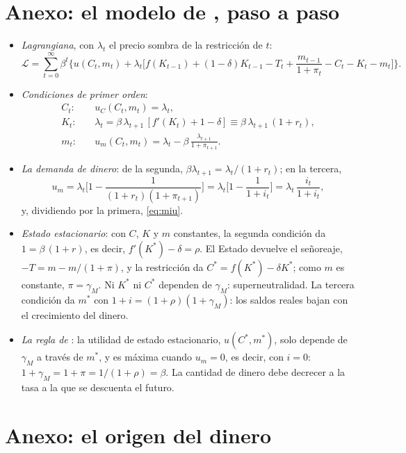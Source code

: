 \documentclass[11pt]{article}
\begin{document}
\clearpage
\appendix

\section{Anexo: el modelo de , paso a paso}\label{anexo:miu}

\begin{itemize}
\item \emph{Lagrangiana}, con $\lambda_t$ el precio sombra de la restricción de $t$:
  $$\mathcal{L}=\sum_{t=0}^{\infty}\beta^t\Big\{u(C_t,m_t)+\lambda_t\Big[f(K_{t-1})+(1-\delta)K_{t-1}-T_t+\frac{m_{t-1}}{1+\pi_t}-C_t-K_t-m_t\Big]\Big\}.$$
\item \emph{Condiciones de primer orden}:
  \begin{align*}
  C_t:&\quad u_C(C_t,m_t)=\lambda_t,\\
  K_t:&\quad \lambda_t=\beta\,\lambda_{t+1}\,[f'(K_t)+1-\delta]\equiv\beta\,\lambda_{t+1}\,(1+r_t),\\
  m_t:&\quad u_m(C_t,m_t)=\lambda_t-\beta\,\frac{\lambda_{t+1}}{1+\pi_{t+1}}.
  \end{align*}
\item \emph{La demanda de dinero}: de la segunda, $\beta\lambda_{t+1}=\lambda_t/(1+r_t)$; en la tercera,
  $$u_m=\lambda_t\Big[1-\frac{1}{(1+r_t)(1+\pi_{t+1})}\Big]=\lambda_t\Big[1-\frac{1}{1+i_t}\Big]=\lambda_t\,\frac{i_t}{1+i_t},$$
  y, dividiendo por la primera, \eqref{eq:miu}.\findemo
\item \emph{Estado estacionario}: con $C$, $K$ y $m$ constantes, la segunda condición da $1=\beta\,(1+r)$, es decir, $f'(K^*)-\delta=\rho$. El Estado devuelve el señoreaje, $-T=m-m/(1+\pi)$, y la restricción da $C^*=f(K^*)-\delta K^*$; como $m$ es constante, $\pi=\gamma_M$. Ni $K^*$ ni $C^*$ dependen de $\gamma_M$: superneutralidad. La tercera condición da $m^*$ con $1+i=(1+\rho)(1+\gamma_M)$: los saldos reales bajan con el crecimiento del dinero.\findemo
\item \emph{La regla de }: la utilidad de estado estacionario, $u(C^*,m^*)$, solo depende de $\gamma_M$ a través de $m^*$, y es máxima cuando $u_m=0$, es decir, con $i=0$: $1+\gamma_M=1+\pi=1/(1+\rho)=\beta$. La cantidad de dinero debe decrecer a la tasa a la que se descuenta el futuro.\findemo
\end{itemize}

\section{Anexo: el origen del dinero}\label{anexo:origen}
\end{document}
